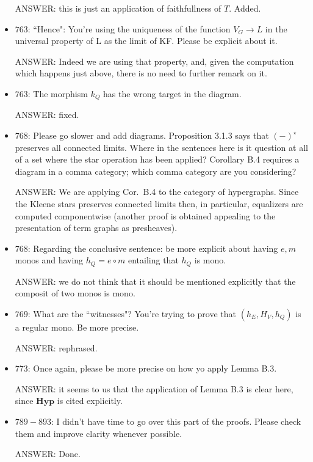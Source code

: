 \documentclass[english,11pt,a4paper]{article}
\begin{document}
\begin{itemize}
ANSWER: this is just an application of faithfullness of $T$. Added.


\item $763$: ``Hence": You're using the uniqueness of the function $V_G \to L$ in the universal property of L as the limit of KF. Please be explicit about it.

ANSWER: Indeed we are using that property, and, given the computation which happens just above, there is no need to further remark on it.


\item $763$: The morphism $k_Q$ has the wrong target in the diagram.

ANSWER: fixed.

\item $768$: Please go slower and add diagrams. Proposition 3.1.3 says that $(-)^\star$ preserves all connected limits. Where in the sentences here is it question at all of a set where the star operation has been applied? Corollary B.4 requires a diagram in a comma category; which comma category are you considering?

ANSWER:  We are applying Cor.~B.4 to the category of hypergraphs. Since the Kleene stars preserves connected limits then, in particular, equalizers are computed componentwise (another proof is obtained appealing to the presentation of term graphs as presheaves). 

\item $768$: Regarding the conclusive sentence: be more explicit about having $e,m$ monos and having $h_Q=e\circ m$ entailing that $h_Q$ is mono.

ANSWER: we do not think that it should be mentioned explicitly that the composit of two monos is mono.

\item $769$: What are the ``witnesses"? You're trying to prove that $(h_E,H_V,h_Q)$ is a regular mono. Be more precise.

ANSWER: rephrased.

\item $773$: Once again, please be more precise on how yo apply Lemma B.3.

ANSWER: it seems to us that the application of Lemma B.3 is clear here, since $\mathbf{Hyp}$ is cited explicitly.

\item $789-893$: I didn't have time to go over this part of the proofs. Please check them and improve clarity whenever possible.

ANSWER: Done.


\end{itemize}
\end{document}
